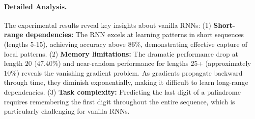 \documentclass[11pt,a4paper]{article}
\begin{document}
\paragraph{Detailed Analysis.} The experimental results reveal key insights about vanilla RNNs: (1) \textbf{Short-range dependencies:} The RNN excels at learning patterns in short sequences (lengths 5-15), achieving accuracy above 86\%, demonstrating effective capture of local patterns. (2) \textbf{Memory limitations:} The dramatic performance drop at length 20 (47.40\%) and near-random performance for lengths 25+ (approximately 10\%) reveals the vanishing gradient problem. As gradients propagate backward through time, they diminish exponentially, making it difficult to learn long-range dependencies. (3) \textbf{Task complexity:} Predicting the last digit of a palindrome requires remembering the first digit throughout the entire sequence, which is particularly challenging for vanilla RNNs.
\end{document}
